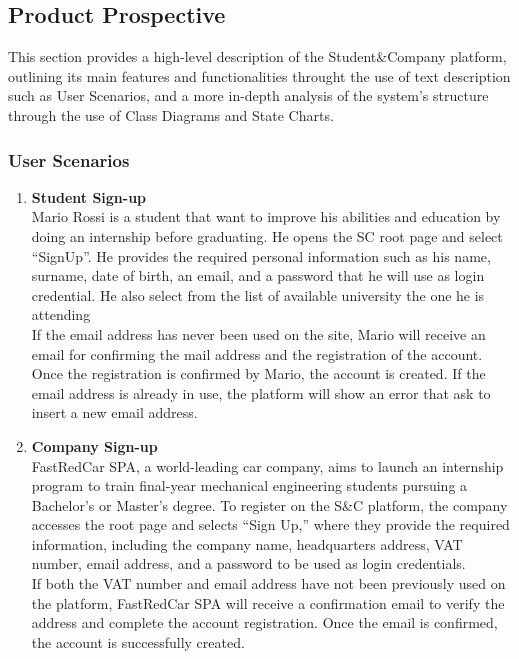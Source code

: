 \subsection{Product Prospective}
This section provides a high-level description of the Student\&Company platform, outlining its main features and functionalities throught the use of text description such as User Scenarios, and a more in-depth analysis of the system's structure through the use of Class Diagrams and State Charts.
\subsubsection{User Scenarios}
\label{subsec: user scenarios}

\begin{enumerate}
        \item \textbf{\textcolor{titleColor}{Student Sign-up}}\\
        Mario Rossi is a student that want to improve his abilities and education by doing an internship before graduating. He opens the SC root page and select “SignUp”. He provides the required personal information such as his name, surname, date of birth, an email, and a password that he will use as login credential. He also select from the list of available university the one he is attending\\
        If the email address has never been used on the site, Mario will receive an email for confirming the mail address and the registration of the account. Once the registration is confirmed by Mario, the account is created. If the email address is already in use, the platform will show an error that ask to insert a new email address.
    \item \textbf{\textcolor{titleColor}{Company Sign-up}}\\
        FastRedCar SPA, a world-leading car company, aims to launch an internship program to train final-year mechanical engineering students pursuing a Bachelor's or Master's degree. To register on the S\&C platform, the company accesses the root page and selects “Sign Up,” where they provide the required information, including the company name, headquarters address, VAT number, email address, and a password to be used as login credentials.\\
        If both the VAT number and email address have not been previously used on the platform, FastRedCar SPA will receive a confirmation email to verify the address and complete the account registration. Once the email is confirmed, the account is successfully created.\\

\end{enumerate}
